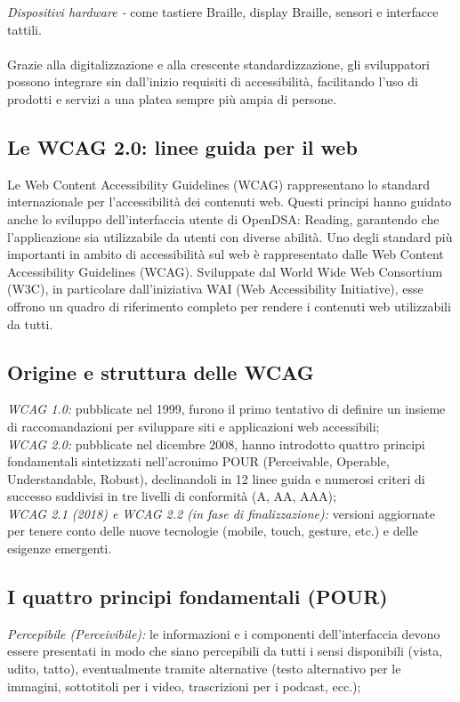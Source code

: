\documentclass[14pt]{extbook}
\begin{document}
\textit{Dispositivi hardware -} come tastiere Braille, display Braille, sensori e interfacce tattili.\\\\

Grazie alla digitalizzazione e alla crescente standardizzazione, gli sviluppatori possono integrare sin dall’inizio requisiti di accessibilità, facilitando l’uso di prodotti e servizi a una platea sempre più ampia di persone.\\

\subsection{Le WCAG 2.0: linee guida per il web}
Le Web Content Accessibility Guidelines (WCAG) \cite{w3c2008wcag20} \cite{w3c2018wcag21} rappresentano lo standard internazionale per l'accessibilità dei contenuti web. Questi principi hanno guidato anche lo sviluppo dell'interfaccia utente di OpenDSA: Reading, garantendo che l'applicazione sia utilizzabile da utenti con diverse abilità. Uno degli standard più importanti in ambito di accessibilità sul web è rappresentato dalle Web Content Accessibility Guidelines (WCAG). Sviluppate dal World Wide Web Consortium (W3C), in particolare dall’iniziativa WAI (Web Accessibility Initiative), esse offrono un quadro di riferimento completo per rendere i contenuti web utilizzabili da tutti.

\subsection{Origine e struttura delle WCAG}
\textit{WCAG 1.0:} pubblicate nel 1999, furono il primo tentativo di definire un insieme di raccomandazioni per sviluppare siti e applicazioni web accessibili;\\
    
\textit{WCAG 2.0:} pubblicate nel dicembre 2008, hanno introdotto quattro principi fondamentali sintetizzati nell’acronimo POUR (Perceivable, Operable, Understandable, Robust), declinandoli in 12 linee guida e numerosi criteri di successo suddivisi in tre livelli di conformità (A, AA, AAA);\\
    
\textit{WCAG 2.1 (2018) e WCAG 2.2 (in fase di finalizzazione):} versioni aggiornate per tenere conto delle nuove tecnologie (mobile, touch, gesture, etc.) e delle esigenze emergenti.\\

\subsection{I quattro principi fondamentali (POUR)}
\textit{Percepibile (Perceivibile):} le informazioni e i componenti dell’interfaccia devono essere presentati in modo che siano percepibili da tutti i sensi disponibili (vista, udito, tatto), eventualmente tramite alternative (testo alternativo per le immagini, sottotitoli per i video, trascrizioni per i podcast, ecc.);\\
\end{document}
